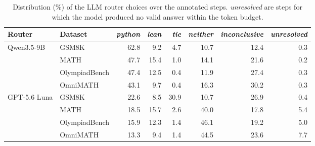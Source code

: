 \begin{table}[ht]
\centering
\small
\begin{tabular}{llrrrrrr}
\hline
\textbf{Router} & \textbf{Dataset} & \textit{python} & \textit{lean} & \textit{tie} & \textit{neither} & \textit{inconclusive} & \textit{unresolved} \\
\hline
Qwen3.5-9B & GSM8K & 62.8 & 9.2 & 4.7 & 10.7 & 12.4 & 0.3 \\
 & MATH & 47.7 & 15.4 & 1.0 & 14.1 & 21.6 & 0.2 \\
 & OlympiadBench & 47.4 & 12.5 & 0.4 & 11.9 & 27.4 & 0.3 \\
 & OmniMATH & 43.1 & 9.7 & 0.4 & 16.3 & 30.2 & 0.3 \\
\hline
GPT-5.6 Luna & GSM8K & 22.6 & 8.5 & 30.9 & 10.7 & 26.9 & 0.4 \\
 & MATH & 18.5 & 15.7 & 2.6 & 40.0 & 17.8 & 5.4 \\
 & OlympiadBench & 15.9 & 12.3 & 1.4 & 46.1 & 19.2 & 5.0 \\
 & OmniMATH & 13.3 & 9.4 & 1.4 & 44.5 & 23.6 & 7.7 \\
\hline
\end{tabular}
\caption{Distribution (\%) of the LLM router choices over the annotated steps. \emph{unresolved} are steps for which the model produced no valid answer within the token budget.}
\label{tab:router_choices}
\end{table}
